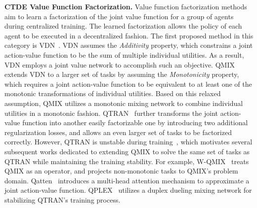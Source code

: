 \documentclass[twoside,11pt]{article}
\newcommand{\additivity}{\textit{Additivity}}
\newcommand{\monotonicity}{\textit{Monotonicity}}
\newcounter{example0}
\begin{document}
\textbf{CTDE Value Function Factorization.} Value function factorization methods aim to learn a factorization of the joint value function for a group of agents during centralized training. The learned factorization allows the policy of each agent to be executed in a decentralized fashion.
The first proposed method in this category is VDN~\citep{Sunehag2018VDN}. VDN assumes the \additivity{} property, which constrains a joint action-value function to be the sum of multiple individual utilities. As a result, VDN employs a joint value network to accomplish such an objective. 
QMIX~\citep{Rashid2018QMIX} extends VDN to a larger set of tasks by assuming the \monotonicity{} property, which requires a joint action-value function to be equivalent to at least one of the monotonic transformations of individual utilities. Based on this relaxed assumption, QMIX utilizes a monotonic mixing network to combine individual utilities in a monotonic fashion. QTRAN~\citep{Son2019QTRAN} further transforms the joint action-value function into another easily factorizable one by introducing two additional regularization losses, and allows an even larger set of tasks to be factorized correctly. However, QTRAN is unstable during training~\citep{Rashid2018QMIX}, which motivates several subsequent works dedicated to extending QMIX to solve the same set of tasks as QTRAN while maintaining the training stability. For example, W-QMIX~\citep{Rashid2020WQMiX} treats QMIX as an operator, and projects non-monotonic tasks to QMIX's problem domain. Qatten~\citep{Yang2020Qatten} introduces a multi-head attention mechanism to approximate a joint action-value function. QPLEX~\citep{Wang2020QPLEX} utilizes a duplex dueling mixing network for stabilizing QTRAN's training process.
\end{document}
